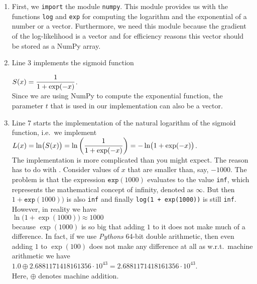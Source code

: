 \begin{enumerate}
\item First, we \texttt{import} the module \texttt{numpy}.  This module provides us with the 
      functions \texttt{log} and \texttt{exp} for computing the logarithm and the exponential of a number or
      a vector.  Furthermore, we need this module because the gradient of the log-likelihood is a vector and for
      efficiency reasons this vector should be stored as a NumPy array.
\item Line 3 implements the sigmoid function

      \hspace*{1.3cm}
      $\displaystyle S(x) = \frac{1}{1 + \exp(-x)}$.
      \\[0.2cm]
      Since we are using NumPy to compute the exponential function, the parameter $t$ that is used in our
      implementation can also be a vector.
\item Line 7 starts the implementation of the natural logarithm of the sigmoid function, i.e.~we implement
      \\[0.2cm]
      \hspace*{1.3cm}
      $\displaystyle L(x) = \ln\bigl(S(x)\bigr) = \ln\left(\frac{1}{1 + \exp(-x)}\right) =- \ln\bigl(1 + \exp(-x)\bigr)$.
      \\[0.2cm]
      The implementation is more complicated than you might expect.  The reason has to do with
      .  Consider values of $x$ that are smaller than, say, $-1000$.  The problem is that
      the expression $\mathtt{exp}(1000)$ evaluates to the value \texttt{inf}, which represents the
      mathematical concept of infinity, denoted as $\infty$.  But then $1 + \mathtt{exp}(1000))$ is also \texttt{inf} and
      finally \texttt{log(1 + exp(1000))} is still \texttt{inf}.  However, in reality we have
      \\[0.2cm]
      \hspace*{1.3cm}
      $\ln\bigl(1 + \exp(1000)\bigr) \approx 1000$
      \\[0.2cm] 
      because $\exp(1000)$ is so big that adding $1$ to it does not make much of a difference.
      In fact, if we use \textsl{Pythons} 64-bit double arithmetic, then even adding $1$ to $\exp(100)$
      does not make any difference at all as w.r.t.~machine arithmetic we have
      \\[0.2cm]
      \hspace*{1.3cm}
      $1.0 \oplus 2.6881171418161356 \cdot 10^{43} = 2.6881171418161356 \cdot 10^{43}$.
      \\[0.2cm]
      Here, $\oplus$ denotes machine addition.
      

\end{enumerate}
